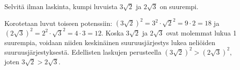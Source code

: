 \begin{tehtavasivu}
\begin{tehtava}
        Selvitä ilman laskinta, kumpi luvuista $3\sqrt{2}$ ja $2\sqrt{3}$ on suurempi. 
       
        \begin{vastaus}
        Korotetaan luvut toiseen potenssiin: $(3\sqrt{2})^2=3^2\cdot\sqrt{2}^2=9 \cdot 2=18$ ja $(2\sqrt{3})^2=2^2\cdot\sqrt{3}^2=4 \cdot 3=12$. Koska $3\sqrt{2}$ ja $2\sqrt{3}$ ovat molemmat lukua 1 suurempia, voidaan niiden keskinäinen suuruusjärjestys lukea neliöiden suuruusjärjestyksestä. Edellisten laskujen perusteella $(3\sqrt{2})^2 > (2\sqrt{3})^2$, joten $3\sqrt{2} > 2\sqrt{3}$.
        \end{vastaus}
\end{tehtava}

\end{tehtavasivu}
